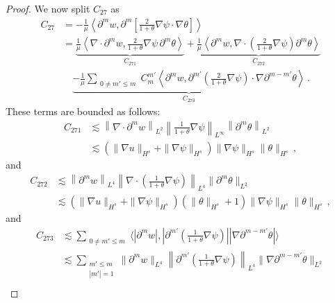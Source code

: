 \documentclass[10pt,a4paper]{amsart}
\begin{document}
\begin{proof}
We now split $C_{27}$ as
\begin{align*}
C_{27}& = -\frac{1}{\mu} \left\langle \partial^m w, \partial^m \left[ \frac{2}{1+\theta} \nabla \psi \cdot \nabla \theta \right] \right\rangle \\&
= \underset{C_{271}}{\underbrace{\frac{1}{\mu} \left\langle \nabla \cdot \partial^m w, \frac{2}{1+\theta} \nabla \psi \, \partial^m \theta \right\rangle}} + \underset{C_{272}}{\underbrace{\frac{1}{\mu} \left\langle \partial^m w, \nabla \cdot \left( \frac{2}{1+\theta} \nabla \psi \right) \partial^m \theta \right\rangle}} \\&
\quad\underset{C_{273}}{\underbrace{- \frac{1}{\mu} \sum_{\substack{0 \neq m' \leq m}} C_m^{m'} \left\langle \partial^m w, \partial^{m'} \left( \frac{2}{1+\theta} \nabla \psi \right) \cdot \nabla \partial^{m-m'} \theta \right\rangle}} \,.
\end{align*}
These terms are bounded as follows:
\begin{equation*}
\begin{aligned}
C_{271}&\lesssim \left\| \nabla \cdot \partial^m w \right\|_{L^2} \left\| \frac{1}{1+\theta} \nabla \psi \right\|_{L^\infty} \left\| \partial^m \theta \right\|_{L^2} \\
&\lesssim (\|\nabla u\|_{H^s} + \|\nabla \psi\|_{H^s}) \|\nabla \psi\|_{H^s} \|\theta\|_{H^s} \,,
\end{aligned}
\end{equation*}
and
\begin{equation*}
\begin{aligned}
C_{272}&\lesssim \left\| \partial^m w \right\|_{L^4} \left\| \nabla \cdot \left(\frac{1}{1+\theta} \nabla \psi\right) \right\|_{L^4} \|\partial^m \theta\|_{L^2} \\
&\lesssim (\|\nabla u\|_{H^s} + \|\nabla \psi\|_{H^s}) (\|\theta\|_{H^s} + 1) \|\nabla \psi\|_{H^s} \|\theta\|_{H^s} \,,
\end{aligned}
\end{equation*}
and
\begin{equation*}
\begin{aligned}
C_{273}&\lesssim \sum_{\substack{0\neq m' \leq m }} \langle |\partial^m w|, |\partial^{m'} \left(\frac{1}{1+\theta} \nabla \psi\right)| |\nabla \partial^{m-m'} \theta| \rangle \\
&\lesssim \sum_{\substack{m' \leq m \\ |m'| =1}} \|\partial^m w\|_{L^4} \left\| \partial^{m'} \left(\frac{1}{1+\theta} \nabla \psi\right) \right\|_{L^4} \|\nabla \partial^{m-m'} \theta\|_{L^2} \\

\end{aligned}
\end{equation*}
\end{proof}
\end{document}
